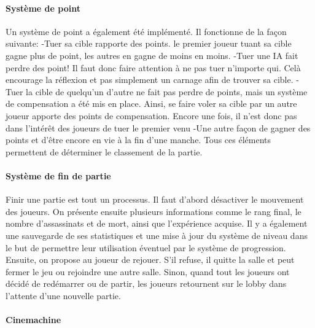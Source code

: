		\paragraph{Système de point}
			Un système de point a également été implémenté. Il fonctionne de la façon suivante:
				-Tuer sa cible rapporte des points. le premier joueur tuant sa cible gagne plus de point, les autres en gagne de moins en moins.
				-Tuer une IA fait perdre des point! Il faut donc faire attention à ne pas tuer n'importe qui. Celà encourage la réflexion et pas simplement un carnage afin de trouver sa cible.
				-Tuer la cible de quelqu'un d'autre ne fait pas perdre de points, mais un système de compensation a été mis en place. Ainsi, se faire voler sa cible par un autre joueur apporte des points de compensation. Encore une fois, il n'est donc pas dans l'intérêt 
				des joueurs de tuer le premier venu
				-Une autre façon de gagner des points et d'être encore en vie à la fin d'une manche.
			Tous ces éléments permettent de déterminer le classement de la partie.
	
		\paragraph{Système de fin de partie}

			Finir une partie est tout un processus. Il faut d'abord désactiver le mouvement des joueurs.
			On présente ensuite plusieurs informations comme le rang final, le nombre d'assassinats
			et de mort, ainsi que l'expérience acquise. Il y a également une sauvegarde de ses statistiques et une mise à jour du système
			de niveau dans le but de permettre leur utilisation éventuel par le système de progression.
			Ensuite, on propose au joueur de rejouer. S'il refuse, il quitte la salle et peut fermer le jeu ou rejoindre une autre salle.
			Sinon, quand tout les joueurs ont décidé de redémarrer ou de partir, les joueurs retournent 
			sur le lobby dans l'attente d'une nouvelle partie.


		\paragraph{Cinemachine}
